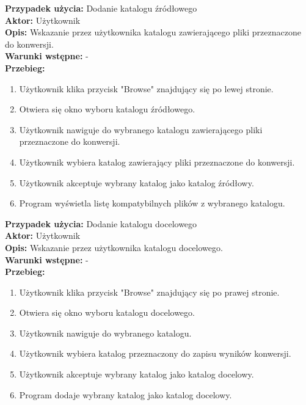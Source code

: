 \noindent \textbf{Przypadek użycia:} Dodanie katalogu źródłowego\\
\textbf{Aktor:} Użytkownik\\
\textbf{Opis:} Wskazanie przez użytkownika katalogu zawierającego pliki przeznaczone do konwersji.\\
\textbf{Warunki wstępne:} -\\
\textbf{Przebieg:}
\begin{enumerate}
	\item Użytkownik klika przycisk "Browse" znajdujący się po lewej stronie.
	\item Otwiera się okno wyboru katalogu źródłowego.
	\item Użytkownik nawiguje do wybranego katalogu zawierającego pliki przeznaczone do konwersji.
	\item Użytkownik wybiera katalog zawierający pliki przeznaczone do konwersji.
	\item Użytkownik akceptuje wybrany katalog jako katalog źródłowy.
	\item Program wyświetla listę kompatybilnych plików z wybranego katalogu.
\end{enumerate}


\noindent \textbf{Przypadek użycia:} Dodanie katalogu docelowego\\
\textbf{Aktor:} Użytkownik\\
\textbf{Opis:} Wskazanie przez użytkownika katalogu docelowego.\\
\textbf{Warunki wstępne:} -\\
\textbf{Przebieg:}
\begin{enumerate}
	\item Użytkownik klika przycisk "Browse" znajdujący się po prawej stronie.
	\item Otwiera się okno wyboru katalogu docelowego.
	\item Użytkownik nawiguje do wybranego katalogu.
	\item Użytkownik wybiera katalog przeznaczony do zapisu wyników konwersji.
	\item Użytkownik akceptuje wybrany katalog jako katalog docelowy.
	\item Program dodaje wybrany katalog jako katalog docelowy.
\end{enumerate}


